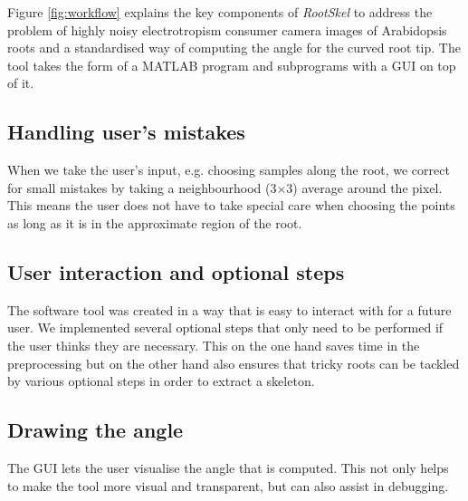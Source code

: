 Figure \ref{fig:workflow} explains the key components of %
\textit{RootSkel} to address the problem of highly noisy electrotropism consumer camera images of Arabidopsis roots and a standardised way of computing the angle for the curved root tip. 
The tool takes the form of a MATLAB program and subprograms with a GUI on top of it.

\subsection{Handling user's mistakes}

When we take the user's input, e.g. choosing samples along the root, we correct for small mistakes by taking a neighbourhood (3\(\times\)3) average around the pixel. 
This means the user does not have to take special care when choosing the points as long as it is in the approximate region of the root.

\subsection{User interaction and optional steps}
The software tool was created in a way that is easy to interact with for a future user. 
We implemented several optional steps that only need to be performed if the user thinks they are necessary. This on the one hand saves time in the preprocessing but on the other hand also ensures that tricky roots can be tackled by various optional steps in order to extract a skeleton. 

\subsection{Drawing the angle}
The GUI lets the user visualise the angle that is computed. This not only helps to make the tool more visual and transparent, but can also assist in debugging. 



